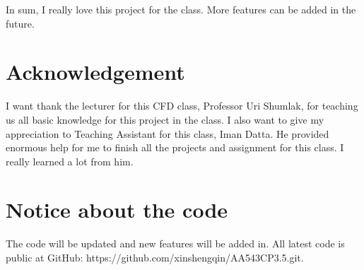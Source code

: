 \documentclass[11pt]{article}
\begin{document}
In sum, I really love this project for the class. More features can be added in the future.

\section{Acknowledgement}
I want thank the lecturer for this CFD class, Professor Uri Shumlak, for teaching us all basic knowledge for this project in the class. 
I also want to give my appreciation to Teaching Assistant for this class, Iman Datta. He provided enormous help for me to finish all the projects and assignment for this class. I really learned a lot from him.  
\section{Notice about the code}
The code will be updated and new features will be added in. 
All latest code is public at GitHub: https://github.com/xinshengqin/AA543CP3.5.git. 
\end{document}
